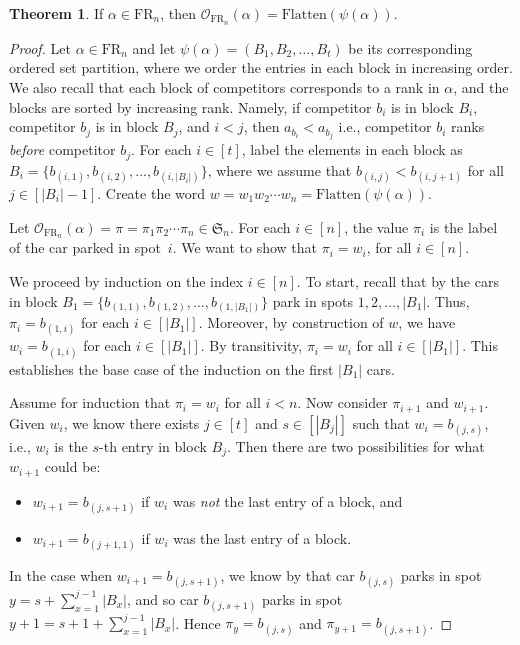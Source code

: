 \documentclass{amsart}
\newcommand{\Flatten}[0]{\mathrm{Flatten}}
\theoremstyle{definition}
\newtheorem{theorem}{Theorem}[section]
\theoremstyle{definition}
\theoremstyle{remark}
\newcommand{\FR}[1]{\mathrm{FR}_{#1}}
\newcommand{\out}{\mathcal{O}}
\newcommand{\Sym}{\mathfrak{S}}
\begin{document}
\begin{theorem}\label{thm:ordered set partition is the outcome}
    If $\alpha\in\FR{n}$, then 
    $\out_{\FR{n}}(\alpha)=\Flatten(\psi(\alpha))$.
\end{theorem}
\begin{proof}
    Let $\alpha\in\FR{n}$ and let $\psi(\alpha)=(B_1,B_2,\ldots,B_t)$ be its corresponding ordered set partition, where we order the entries in each block in increasing order. 
    We also recall that each block of competitors corresponds to a rank in $\alpha$, and the blocks are sorted by increasing rank. Namely, if competitor $b_i$ is in block $B_i$, competitor $b_j$ is in block $B_j$, and $i < j$, then $a_{b_i} < a_{b_j}$ i.e., competitor $b_i$ ranks \textit{before} competitor $b_j$. 
    For each $i\in[t]$, label the elements in each block as $B_i=\{b_{(i,1)},b_{(i,2)},\ldots,b_{(i,|B_i|)}\}$, where we assume that $b_{(i,j)}<b_{(i,j+1)}$ for all $j\in[|B_i|-1]$. 
    Create the word $w=w_1w_2\cdots w_n=\Flatten(\psi(\alpha))$.
    
    
    Let
    $\out_{\FR{n}}(\alpha)=\pi=\pi_1\pi_2\cdots\pi_n\in\Sym_n$. 
    For each $i\in [n]$, the value $\pi_i$ is the label of the car parked in spot~$i$.
    We want to show that 
    $\pi_i=w_i$, for all $i\in[n]$.
    
    
    We proceed by induction on the index $i\in[n]$. 
    To start, recall that by  
    the cars in block 
    $B_1=\{b_{(1,1)},b_{(1,2)},\ldots,b_{(1,|B_1|)}\}$ park in spots $1,2,\ldots,|B_1|$.
    Thus, $\pi_i=b_{(1,i)}$ for each $i\in[|B_1|]$. 
    Moreover, by construction of $w$, we have $w_i=b_{(1,i)}$ for each $i\in[|B_1|]$. By transitivity, $\pi_i=w_i$ for all $i\in[|B_1|]$.
    This establishes the base case of the induction on the first $|B_1|$ cars.
    
    Assume for induction that $\pi_i=w_i$ for all $i< n$.
    Now consider $\pi_{i+1}$ and $w_{i+1}$.
    Given $w_i$, we know there exists $j\in[t]$ and $s\in[|B_j|]$ such that 
    $w_{i}=b_{(j,s)}$, i.e., $w_i$ is the $s$-th entry in block $B_j$. 
    Then there are two possibilities for what $w_{i+1}$ could be:
    \begin{itemize}
        \item $w_{i+1}=b_{(j,s+1)}$ if $w_i$ was \textit{not} the last entry of a block, and 
        \item $w_{i+1}=b_{(j+1,1)}$ if $w_i$ was the last entry of a block.
    \end{itemize}
    In the case when $w_{i+1}=b_{(j,s+1)}$, we know by  that car $b_{(j,s)}$ parks in spot 
    $y=s+\sum_{x=1}^{j-1}|B_x|$,
    and so car $b_{(j,s+1)}$ parks in spot 
    $y+1=s+1+\sum_{x=1}^{j-1}|B_x|$.
    Hence $\pi_y=b_{(j,s)}$ and $\pi_{y+1}=b_{(j,s+1)}$.
    

\end{proof}
\end{document}
